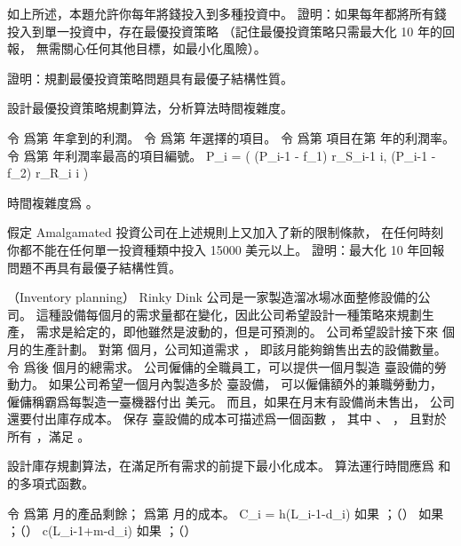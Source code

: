 \startigNum
\startitem
如上所述，本題允許你每年將錢投入到多種投資中。
證明：如果每年都將所有錢投入到單一投資中，存在最優投資策略
（記住最優投資策略只需最大化 10 年的回報，
無需關心任何其他目標，如最小化風險）。
\stopitem
\stopigNum

\startigNum[continue]
\startitem
證明：規劃最優投資策略問題具有最優子結構性質。
\stopitem
\stopigNum

\startigNum[continue]
\startitem
設計最優投資策略規劃算法，分析算法時間複雜度。
\stopitem
\stopigNum

\startANSWER
令  爲第  年拿到的利潤。
令  爲第  年選擇的項目。
令  爲第  項目在第  年的利潤率。
令  爲第  年利潤率最高的項目編號。
\startformula
P_i = \max(
(P_{i-1} - f_1) \times r_{S_{i-1} i},
(P_{i-1} - f_2) \times r_{R_i i}
)
\stopformula

時間複雜度爲 。
\stopANSWER

\startigNum[continue]
\startitem
假定 Amalgamated 投資公司在上述規則上又加入了新的限制條款，
在任何時刻你都不能在任何單一投資種類中投入 15000 美元以上。
證明：最大化 10 年回報問題不再具有最優子結構性質。
\stopitem
\stopigNum
\stopPROBLEM

\startPROBLEM
（Inventory planning）
Rinky Dink 公司是一家製造溜冰場冰面整修設備的公司。
這種設備每個月的需求量都在變化，因此公司希望設計一種策略來規劃生產，
需求是給定的，即他雖然是波動的，但是可預測的。
公司希望設計接下來  個月的生產計劃。
對第  個月，公司知道需求 ，
即該月能夠銷售出去的設備數量。
令  爲後  個月的總需求。
公司僱傭的全職員工，可以提供一個月製造  臺設備的勞動力。
如果公司希望一個月內製造多於  臺設備，
可以僱傭額外的兼職勞動力，
僱傭稱霸爲每製造一臺機器付出  美元。
而且，如果在月末有設備尚未售出，
公司還要付出庫存成本。
保存  臺設備的成本可描述爲一個函數 ，
其中 、 ，
且對於所有 ，滿足 。

設計庫存規劃算法，在滿足所有需求的前提下最小化成本。
算法運行時間應爲  和  的多項式函數。
\stopPROBLEM

\startANSWER
令  爲第  月的產品剩餘；  爲第  月的成本。
\startformula
C_i = \startcases
\NC h(L_{i-1}-d_i) \NC 如果 ；（） \NR
{} \NC 如果 ；（） \NR
\NC c\times (L_{i-1}+m-d_i) \NC 如果 ；（） \NR
\stopcases
\stopformula

